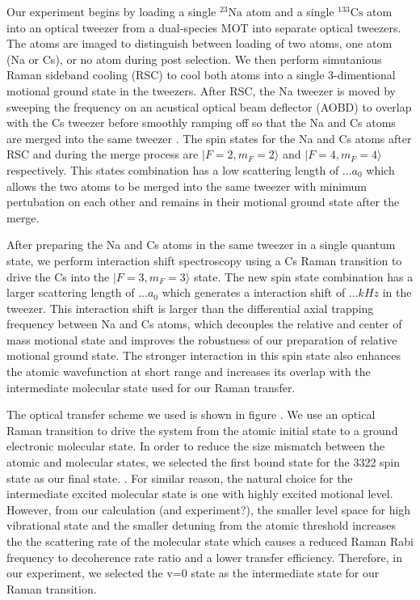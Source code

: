 \documentclass[aps,prl,twocolumn,groupedaddress]{revtex4-1}
\newcommand{\todo}[1]{}
\begin{document}
Our experiment begins by loading a single ${}^{23}\mathrm{Na}$ atom and a single ${}^{133}\mathrm{Cs}$ atom into an optical tweezer from a dual-species MOT\todo{cite na loading paper} into separate optical tweezers. The atoms are imaged to distinguish between loading of two atoms, one atom (Na or Cs), or no atom during post selection. We then perform simutanious Raman sideband cooling (RSC) to cool both atoms into a single 3-dimentional motional ground state in the tweezers. After RSC, the Na tweezer is moved by sweeping the frequency on an acustical optical beam deflector (AOBD) to overlap with the Cs tweezer before smoothly ramping off so that the Na and Cs atoms are merged into the same tweezer \todo{cite}. The spin states for the Na and Cs atoms after RSC and during the merge process are $|F=2,m_F=2\rangle$ and $|F=4,m_F=4\rangle$ respectively. This states combination has a low scattering length of $... a_0$ which allows the two atoms to be merged into the same tweezer with minimum pertubation on each other and remains in their motional ground state after the merge.

After preparing the Na and Cs atoms in the same tweezer in a single quantum state, we perform interaction shift spectroscopy using a Cs Raman transition to drive the Cs into the $|F=3,m_F=3\rangle$ state. The new spin state combination has a larger scattering length of $... a_0$ which generates a interaction shift of $... kHz$ in the tweezer. This interaction shift is larger than the differential axial trapping frequency between Na and Cs atoms, which decouples the relative and center of mass motional state and improves the robustness of our preparation of relative motional ground state. The stronger interaction in this spin state also enhances the atomic wavefunction at short range and increases its overlap with the intermediate molecular state used for our Raman transfer.



The optical transfer scheme we used is shown in figure \todo{}.
We use an optical Raman transition to drive the system from the atomic initial state to a
ground electronic molecular state. In order to reduce the size mismatch between the atomic and molecular states,
we selected the first bound state for the 3322 spin state \todo{asymtopt to the 3322 threshold?} as our final state. \todo{move selection of intermediate state to intro?}.
For similar reason, the natural choice for the intermediate excited molecular state is one
with highly excited motional level.
However, from our calculation (and experiment?), the smaller level space for high
vibrational state and the smaller detuning from the atomic threshold increases the
the scattering rate of the molecular state which causes a reduced Raman Rabi frequency
to decoherence rate ratio and a lower transfer efficiency.
Therefore, in our experiment, we selected the v=0 state as the intermediate state for our
Raman transition.
\end{document}
